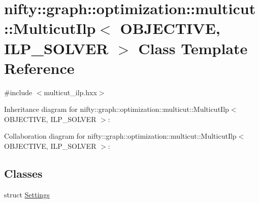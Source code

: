 \hypertarget{classnifty_1_1graph_1_1optimization_1_1multicut_1_1MulticutIlp}{}\section{nifty\+:\+:graph\+:\+:optimization\+:\+:multicut\+:\+:Multicut\+Ilp$<$ O\+B\+J\+E\+C\+T\+I\+V\+E, I\+L\+P\+\_\+\+S\+O\+L\+V\+E\+R $>$ Class Template Reference}
\label{classnifty_1_1graph_1_1optimization_1_1multicut_1_1MulticutIlp}


{\ttfamily \#include $<$multicut\+\_\+ilp.\+hxx$>$}



Inheritance diagram for nifty\+:\+:graph\+:\+:optimization\+:\+:multicut\+:\+:Multicut\+Ilp$<$ O\+B\+J\+E\+C\+T\+I\+V\+E, I\+L\+P\+\_\+\+S\+O\+L\+V\+E\+R $>$\+:


Collaboration diagram for nifty\+:\+:graph\+:\+:optimization\+:\+:multicut\+:\+:Multicut\+Ilp$<$ O\+B\+J\+E\+C\+T\+I\+V\+E, I\+L\+P\+\_\+\+S\+O\+L\+V\+E\+R $>$\+:
\subsection*{Classes}
\begin{DoxyCompactItemize}
\item 
struct \hyperlink{structnifty_1_1graph_1_1optimization_1_1multicut_1_1MulticutIlp_1_1Settings}{Settings}
\end{DoxyCompactItemize}
